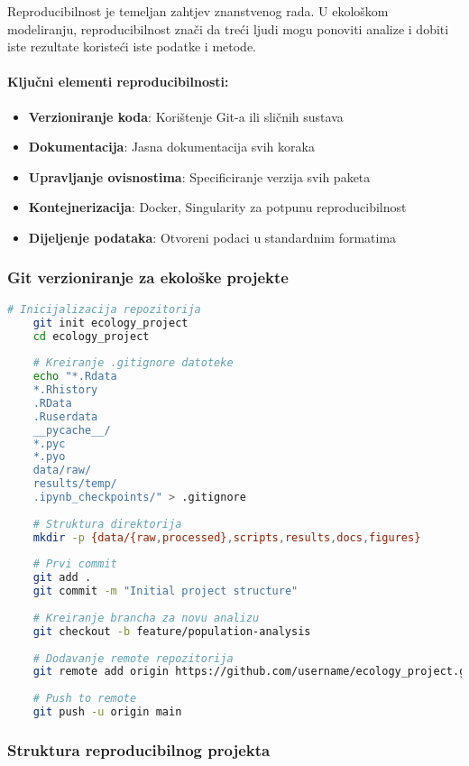 \documentclass[11pt,oneside]{book}
\begin{document}
Reproducibilnost je temeljan zahtjev znanstvenog rada. U ekološkom modeliranju, reproducibilnost znači da treći ljudi mogu ponoviti analize i dobiti iste rezultate koristeći iste podatke i metode.

\paragraph{Ključni elementi reproducibilnosti:}

\begin{itemize}
	\item \textbf{Verzioniranje koda}: Korištenje Git-a ili sličnih sustava
	\item \textbf{Dokumentacija}: Jasna dokumentacija svih koraka
	\item \textbf{Upravljanje ovisnostima}: Specificiranje verzija svih paketa
	\item \textbf{Kontejnerizacija}: Docker, Singularity za potpunu reproducibilnost
	\item \textbf{Dijeljenje podataka}: Otvoreni podaci u standardnim formatima
\end{itemize}

\subsubsection{Git verzioniranje za ekološke projekte}

\begin{lstlisting}[language=bash, caption=Git workflow za ekološke projekte]
	# Inicijalizacija repozitorija
	git init ecology_project
	cd ecology_project
	
	# Kreiranje .gitignore datoteke
	echo "*.Rdata
	*.Rhistory
	.RData
	.Ruserdata
	__pycache__/
	*.pyc
	*.pyo
	data/raw/
	results/temp/
	.ipynb_checkpoints/" > .gitignore
	
	# Struktura direktorija
	mkdir -p {data/{raw,processed},scripts,results,docs,figures}
	
	# Prvi commit
	git add .
	git commit -m "Initial project structure"
	
	# Kreiranje brancha za novu analizu
	git checkout -b feature/population-analysis
	
	# Dodavanje remote repozitorija
	git remote add origin https://github.com/username/ecology_project.git
	
	# Push to remote
	git push -u origin main
\end{lstlisting}

\subsubsection{Struktura reproducibilnog projekta}
\end{document}
